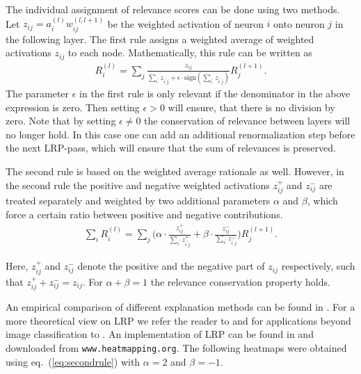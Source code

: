 \documentclass[runningheads]{llncs}
\begin{document}
The individual assignment of relevance scores can be done using two methods. Let  $z_{ij} = a_{i}^{(l)}w_{ij}^{(l,l+1)}$
 be the weighted activation of neuron $i$ onto neuron $j$ in the following layer. 
The first rule assigns a weighted average of weighted activations $z_{ij}$ to each node. Mathematically, this rule can be written as
\begin{align}
  R_{i}^{(l)} =  \sum_{j} \frac{
  	z_{ij}
  }
  {
  \sum_{i^{\prime}} z_{i^{\prime}j} + \epsilon \cdot \mathrm{sign}(\sum_{i^{\prime}} z_{i^{\prime}j})
  } R_{j}^{(l + 1)}.
  \label{eq:firstrule}
\end{align}
The parameter $\epsilon$ in the first rule is only relevant if the denominator in the above expression is zero. Then setting $\epsilon>0$ will ensure, that there is no division by zero. Note that by setting $\epsilon\neq0$ the conservation of relevance between layers will no longer hold. In this case one can add an additional renormalization step before the next LRP-pass, which will ensure that the sum of relevances is preserved.

The second rule is based on the weighted average rationale as well. However, in the second rule the positive and negative weighted activations $z_{ij}^{+}$ and $z_{ij}^{-}$ are treated separately and weighted by two additional parameters $\alpha$ and $\beta$, which force a certain ratio between positive and negative contributions.
\begin{align}
  \sum_{i} R_{i}^{(l)} = \sum_{j} \big(
   \alpha\cdot \frac{z^{+}_{ij}}{\sum_{i^{\prime}}z_{i^{\prime}j}^{+}} + 
   \beta \cdot \frac{z^{-}_{ij}}{\sum_{i^{\prime}}z_{i^{\prime}j}^{-}}   
  \big) R_{j}^{(l + 1)}.
    \label{eq:secondrule}
\end{align}

Here, $z_{ij}^{+}$ and $z_{ij}^{-}$ denote the positive and the negative part of $z_{ij}$ respectively, such that $z_{ij}^{+} + z_{ij}^{-}=z_{ij}$. For $\alpha+\beta=1$ the relevance conservation property holds.

An empirical comparison of different explanation methods can be found in \cite{samek2015evaluating}.
For a more theoretical view on LRP we refer the reader to \cite{MonArXiv15} and for applications beyond image classification to \cite{ArrACL16,StuArXiv16}.
An implementation of LRP can be found in \cite{LapJMLR16} and downloaded from \texttt{www.heatmapping.org}.
The following heatmaps were obtained using eq.~(\ref{eq:secondrule}) with $\alpha=2$ and $\beta=-1$.

\end{document}
